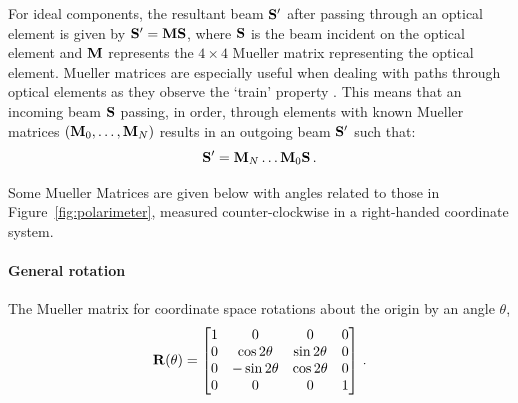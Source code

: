 For ideal components, the resultant beam $\mathbf{S}^{\prime}$ after passing through an optical element is given by $\mathbf{S}^{\prime} = \mathbf{M} \mathbf{S}$, where $\mathbf{S}$ is the beam incident on the optical element and $\mathbf{M}$ represents the $4 \times 4$ Mueller matrix representing the optical element. Mueller matrices are especially useful when dealing with paths through optical elements as they observe the `train' property \citep{Mueller_train}. This means that an incoming beam $\mathbf{S}$ passing, in order, through elements with known Mueller matrices $(\mathbf{M}_{0}, \dots, \mathbf{M}_{N})$ results in an outgoing beam $\mathbf{S}^{\prime}$ such that:
\begin{equation}
    \mathbf{S}^{\prime} = \mathbf{M}_{N} \dots \mathbf{M}_{0} \mathbf{S}\,.\label{eq:mueller_train}
\end{equation}

Some Mueller Matrices are given below with angles related to those in Figure~\ref{fig:polarimeter}, measured counter-clockwise in a right-handed coordinate system.

\paragraph{General rotation}
The Mueller matrix for coordinate space rotations about the origin by an angle $\theta$,
\begin{equation}
    \mathbf{R}(\theta) =
    \begin{bmatrix}
        1 & 0              & 0             & 0 \\
        0 & \cos 2 \theta  & \sin 2 \theta & 0 \\
        0 & -\sin 2 \theta & \cos 2 \theta & 0 \\
        0 & 0              & 0             & 1 \\
    \end{bmatrix}\,.\label{matrix:rotate}
\end{equation}

